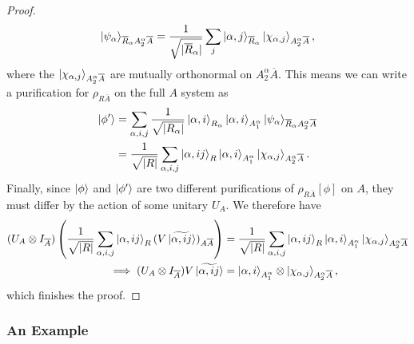\documentclass[12pt,a4paper]{report}
\numberwithin{equation}{section}
\newcommand{\ol}[1]{\overline{#1}}
\theoremstyle{definition}
\theoremstyle{theorem}
\theoremstyle{theorem}
\theoremstyle{example}
\theoremstyle{definition}
\begin{document}
\begin{proof}
	\begin{equation}
		\ket{\psi_{\alpha}}_{\ol{R}_{\alpha}A_{2}^{\alpha}\ol{A}}=\frac{1}{\sqrt{|\ol{R}_{\alpha}|}}\sum_{j}\ket{\alpha,j}_{\ol{R}_{\alpha}}\ket{\chi_{\alpha,j}}_{A_{2}^{\alpha}\ol{A}},
	\end{equation}
	where the $\ket{\chi_{\alpha,j}}_{A_{2}^{\alpha}\ol{A}}$ are mutually orthonormal on $A_{2}^{\alpha}\ol{A}$. This means we can write a purification for $\rho_{R\ol{A}}$ on the full $A$ system as
	\begin{equation}
		\begin{aligned}
			\ket{\phi'}&=\sum_{\alpha,i,j}\frac{1}{\sqrt{|R_{\alpha}|}}\ket{\alpha,i}_{R_{\alpha}}\ket{\alpha,i}_{A_{1}^{\alpha}}\ket{\psi_{\alpha}}_{\ol{R}_{\alpha}A_{2}^{\alpha}\ol{A}}\\&=\frac{1}{\sqrt{|R|}}\sum_{\alpha,i,j}\ket{\alpha,ij}_{R}\ket{\alpha,i}_{A_{1}^{\alpha}}\ket{\chi_{\alpha,j}}_{A_{2}^{\alpha}\ol{A}}.
		\end{aligned}
	\end{equation}
	Finally, since $\ket{\phi}$ and $\ket{\phi'}$ are two different purifications of $\rho_{R\ol{A}}[\phi]$ on $A$, they must differ by the action of some unitary $U_{A}$. We therefore have
	\begin{equation}
		\begin{aligned}
			(U_{A}\otimes I_{\ol{A}})\left(\frac{1}{\sqrt{|R|}}\sum_{\alpha,i,j}\ket{\alpha,ij}_{R}(V\ket{\widetilde{\alpha, ij}})_{A\ol{A}}\right)&=\frac{1}{\sqrt{|R|}}\sum_{\alpha,i,j}\ket{\alpha,ij}_{R}\ket{\alpha,i}_{A_{1}^{\alpha}}\ket{\chi_{\alpha,j}}_{A_{2}^{\alpha}\ol{A}}\\
			\implies (U_{A}\otimes I_{\ol{A}})V\ket{\widetilde{\alpha,ij}}&=\ket{\alpha,i}_{A_{1}^{\alpha}}\otimes\ket{\chi_{\alpha,j}}_{A_{2}^{\alpha}\ol{A}},
		\end{aligned}
	\end{equation}
	which finishes the proof.
\end{proof}
\subsubsection{An Example}
\end{document}
